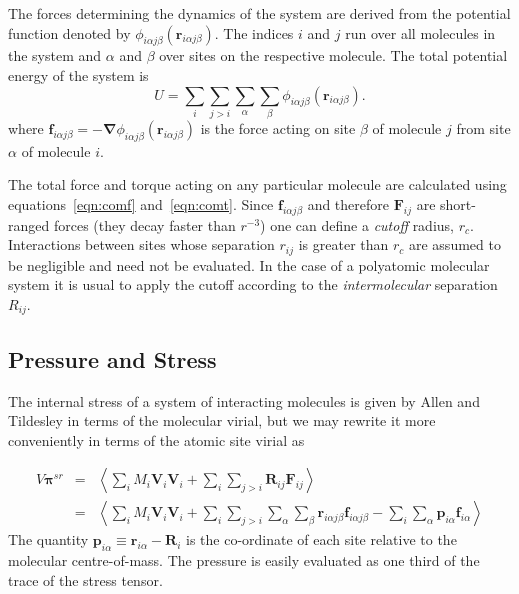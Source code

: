 The forces determining the dynamics of the system are derived from the
potential    function    denoted     by   $\phi_{i\alpha  j\beta}(\bm{r}
_{i\alpha j\beta})$.  The indices $i$ and $j$ run  over all molecules
in the system and  $\alpha$ and $\beta$ over  sites on  the respective
molecule. The total potential energy of the system is
\begin{equation}
\label{eqn:toten}
U = \sum_i \sum_{j > i} \sum_\alpha \sum_\beta \phi_{i\alpha j\beta}(
\bm{r}_{i\alpha j\beta}).
\end{equation}
where $\bm{f}_{i\alpha j\beta} = - \bm{\nabla} \phi_{i\alpha  j\beta}(
\bm{r}_{i\alpha j\beta})$ is the force acting on site $\beta$ of molecule
$j$ from site $\alpha$ of molecule $i$.

The total force and torque acting on any particular molecule are
calculated using equations~\ref{eqn:comf} and~\ref{eqn:comt}.  Since
$\bm{f}_{i\alpha j\beta}$ and therefore $\bm{F}_{ij}$ are short-ranged
forces (\ie  they decay faster than $r^{-3}$) one can define a {\em
cutoff\/} radius, $r_c$.  Interactions between sites whose separation
$r_{ij}$ is greater than $r_c$ are assumed to be negligible and need
not be evaluated.  In the case of a polyatomic molecular system it is
usual to apply the cutoff according to the {\em intermolecular\/}
separation $R_{ij}$.


\subsection{Pressure and Stress}
The internal stress of a system of interacting molecules is given by
Allen and Tildesley\cite[pp 46-49]{allen:87} in terms of the molecular
virial, but we may rewrite it more conveniently in terms of the atomic
site virial as

\begin{eqnarray}
\label{eqn:stress-sr}
V \bm{\pi}^{sr} & = & \left <  \sum_i M_i \bm{V}_i \bm{V}_i 
              + \sum_i \sum_{j>i} \bm{R}_{ij} \bm{F}_{ij} 
\right > \\ \nonumber
& = & \left < \sum_i M_i \bm{V}_i \bm{V}_i 
              + \sum_{i} \sum_{j>i} \sum_\alpha \sum_\beta 
                \bm{r}_{i\alpha j\beta}  \bm{f}_{i\alpha j\beta} 
              - \sum_i \sum_\alpha \bm{p}_{i\alpha} \bm{f}_{i\alpha}
\right >
\end{eqnarray}
The quantity $\bm{p}_{i\alpha} \equiv \bm{r}_{i\alpha} - \bm{R}_i$ is the
co-ordinate of each site relative to the molecular centre-of-mass.
The pressure is easily evaluated as one third of the trace of the
stress tensor. 

